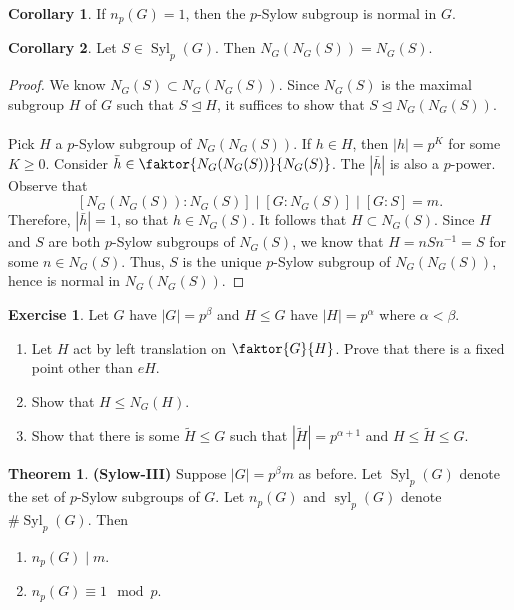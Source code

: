 \documentclass[10pt,letterpaper,cm]{nupset}
\theoremstyle{definition}
\newtheorem{theorem}{Theorem}
\newtheorem{corollary}{Corollary}
\newtheorem{exercise}{Exercise}
\newcommand{\1}{\mathbf{1}}
\newcommand{\0}{\vec 0}
\DeclareMathOperator{\syl}{syl}
\DeclareMathOperator{\Syl}{Syl}
\begin{document}
\begin{corollary}
If $n_p(G)=1$, then the $p$-Sylow subgroup is normal in $G$.
\end{corollary}

\begin{corollary}
Let $S\in \Syl_p(G)$. Then $N_G(N_G(S)) = N_G(S)$.
\end{corollary}

\begin{proof}
We know $N_G(S) \subset N_G(N_G(S))$. Since $N_G(S)$ is the maximal subgroup $H$ of $G$ such that $S\unlhd H$, it suffices to show that $S\unlhd N_G(N_G(S))$.
\\ \\
Pick $H$ a $p$-Sylow subgroup of $N_G(N_G(S))$. If $h\in H$, then $|h| =p^K$ for some $K\geq 0$. Consider $\bar{h} \in \faktor{N_G(N_G(S))}{N_G(S)}$. The $|\bar{h}|$ is also a $p$-power. Observe that $$[N_G(N_G(S)): N_G(S)]\mid [G: N_G(S)] \mid [G:S]=m.$$ Therefore, $|\bar{h}| =1$, so that $h \in N_G(S)$. It follows that $H \subset N_G(S)$. Since $H$ and $S$ are both $p$-Sylow subgroups of $N_G(S)$, we know that $H = nSn^{-1} = S$ for some $n\in N_G(S)$. Thus, $S$ is the unique $p$-Sylow subgroup of $N_G(N_G(S))$, hence is normal in $N_G(N_G(S))$.
\end{proof}

\begin{exercise} Let $G$ have $|G|=p^{\beta}$ and $H\leq G$ have $|H|=p^{\alpha}$ where $\alpha < \beta$. 
\begin{enumerate}
\item Let $H$ act by left translation on $\faktor{G}{H}$. Prove that there is a fixed point other than $eH$.
\item Show that $H\leq N_G(H)$.
\item Show that there is some $\tilde{H} \leq G$ such that $|\tilde{H}| =p^{\alpha+1}$ and $H \leq \tilde{H} \leq G$.
\end{enumerate}
\end{exercise}

\begin{theorem}{\textbf{(Sylow-III)}}
Suppose $|G|= p^{\beta}m$ as before. Let $\Syl_p(G)$ denote the set of $p$-Sylow subgroups of $G$. Let $n_p(G)$ and $\syl_p(G)$ denote $\# \Syl_p(G)$. Then
\begin{enumerate}
\item $n_p(G) \mid m$.
\item $n_p(G) \equiv 1 \mod p$.
\end{enumerate}
\end{theorem}
\end{document}

